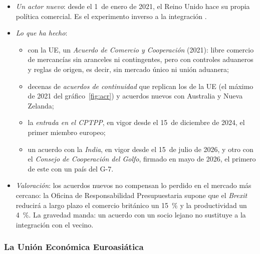 \documentclass[11pt]{article}
\begin{document}
\begin{itemize}
\item \emph{Un actor nuevo}: desde el 1~de enero de 2021, el Reino Unido hace su propia política comercial. Es el experimento inverso a la integración .
\item \emph{Lo que ha hecho}:
  \begin{itemize}
  \item con la UE, un \emph{Acuerdo de Comercio y Cooperación} (2021): libre comercio de mercancías sin aranceles ni contingentes, pero con controles aduaneros y reglas de origen, es decir, sin mercado único ni unión aduanera;
  \item decenas de \emph{acuerdos de continuidad} que replican los de la UE (el máximo de 2021 del gráfico~\ref{fig:acr}) y acuerdos nuevos con Australia y Nueva Zelanda;
  \item la \emph{entrada en el CPTPP}, en vigor desde el 15~de diciembre de 2024, el primer miembro europeo;
  \item un acuerdo con la \emph{India}, en vigor desde el 15~de julio de 2026\nocite{ODI2026ReinoUnidoIndia}, y otro con el \emph{Consejo de Cooperación del Golfo}, firmado en mayo de 2026, el primero de este con un país del G-7\nocite{PwC2026ReinoUnidoCCG}.
  \end{itemize}
\item \emph{Valoración}: los acuerdos nuevos no compensan lo perdido en el mercado más cercano: la Oficina de Responsabilidad Presupuestaria supone que el \emph{Brexit} reducirá a largo plazo el comercio británico un 15~\% y la productividad un 4~\%\nocite{OBR2026Brexit}. La gravedad manda: un acuerdo con un socio lejano no sustituye a la integración con el vecino.
\end{itemize}

\subsubsection{La Unión Económica Euroasiática}\label{sec:uee}
\end{document}
